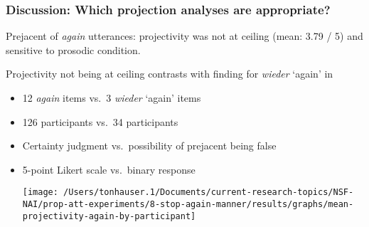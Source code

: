 \documentclass[pdf,xcolor=table,envcountsect,handout]{beamer}
\begin{document}
\begin{frame}
\frametitle{Discussion: Which projection analyses are appropriate?}

Prejacent of {\em again} utterances: projectivity was not at ceiling (mean: 3.79 / 5) and sensitive to prosodic condition.

\pause

Projectivity not being at ceiling contrasts with finding for {\em wieder} `again' in \citealt{xue-onea11}

\pause

\begin{itemize}[topsep=-3pt]

\item 12 {\em again} items vs.\ 3 {\em wieder} `again' items

\item 126 participants vs.\ 34 participants

\item Certainty judgment vs.\ possibility of prejacent being false

\pause

\item 5-point Likert scale vs.\ binary response

\pause

\hspace*{.5cm} \texttt{[image: /Users/tonhauser.1/Documents/current-research-topics/NSF-NAI/prop-att-experiments/8-stop-again-manner/results/graphs/mean-projectivity-again-by-participant]}

\end{itemize}

\end{frame}
\end{document}
